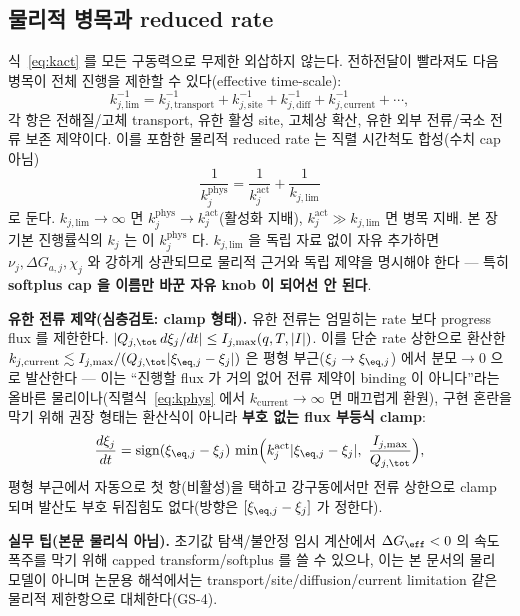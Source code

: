 \subsection{물리적 병목과 reduced rate}
식~\eqref{eq:kact} 를 모든 구동력으로 무제한 외삽하지 않는다. 전하전달이 빨라져도 다음 병목이 전체
진행을 제한할 수 있다(effective time-scale):
\begin{equation}
k_{j,\mathrm{lim}}^{-1}=k_{j,\mathrm{transport}}^{-1}+k_{j,\mathrm{site}}^{-1}+k_{j,\mathrm{diff}}^{-1}
+k_{j,\mathrm{current}}^{-1}+\cdots,
\label{eq:klim_comp}
\end{equation}
각 항은 전해질/고체 transport, 유한 활성 site, 고체상 확산, 유한 외부 전류/국소 전류 보존 제약이다.
이를 포함한 물리적 reduced rate 는 직렬 시간척도 합성(수치 cap 아님)
\begin{equation}
\boxed{\;\frac{1}{k_j^\mathrm{phys}}=\frac{1}{k_j^\mathrm{act}}+\frac{1}{k_{j,\mathrm{lim}}}\;}
\label{eq:kphys}
\end{equation}
로 둔다. $k_{j,\mathrm{lim}}\to\infty$ 면 $k_j^\mathrm{phys}\to k_j^\mathrm{act}$(활성화 지배),
$k_j^\mathrm{act}\gg k_{j,\mathrm{lim}}$ 면 병목 지배. 본 장 기본 진행률식의 $k_j$ 는 이
$k_j^\mathrm{phys}$ 다. $k_{j,\mathrm{lim}}$ 을 독립 자료 없이 자유 추가하면 $\nu_j,\Delta G_{a,j},\chi_j$
와 강하게 상관되므로 물리적 근거와 독립 제약을 명시해야 한다 — 특히 \textbf{softplus cap 을 이름만 바꾼
자유 knob 이 되어선 안 된다}.

\textbf{유한 전류 제약(심층검토: clamp 형태).} 유한 전류는 엄밀히는 rate 보다 progress flux 를 제한한다.
$|Q_{j,\tot}\,d\xi_j/dt|\le I_{j,\max}(q,T,|I|)$. 이를 단순 rate 상한으로 환산한
$k_{j,\mathrm{current}}\lesssim I_{j,\max}/(Q_{j,\tot}|\xi_{\eq,j}-\xi_j|)$ 은 평형 부근($\xi_j\to\xi_{\eq,j}$)
에서 분모$\to0$ 으로 발산한다 — 이는 ``진행할 flux 가 거의 없어 전류 제약이 binding 이 아니다''라는
올바른 물리이나(직렬식~\eqref{eq:kphys} 에서 $k_{\mathrm{current}}\to\infty$ 면 매끄럽게 환원), 구현
혼란을 막기 위해 권장 형태는 환산식이 아니라 \textbf{부호 없는 flux 부등식 clamp}:
\begin{equation}
\frac{d\xi_j}{dt}=\operatorname{sign}(\xi_{\eq,j}-\xi_j)\,
\min\!\Big(k_j^\mathrm{act}|\xi_{\eq,j}-\xi_j|,\ \frac{I_{j,\max}}{Q_{j,\tot}}\Big),
\label{eq:clamp}
\end{equation}
평형 부근에서 자동으로 첫 항(비활성)을 택하고 강구동에서만 전류 상한으로 clamp 되며 발산도 부호
뒤집힘도 없다(방향은 $[\xi_{\eq,j}-\xi_j]$ 가 정한다).
\begin{mdframed}
\textbf{실무 팁(본문 물리식 아님).} 초기값 탐색/불안정 임시 계산에서 $\Delta G_{\eff}<0$ 의 속도 폭주를
막기 위해 capped transform/softplus 를 쓸 수 있으나, 이는 본 문서의 물리 모델이 아니며 논문용 해석에서는
transport/site/diffusion/current limitation 같은 물리적 제한항으로 대체한다(GS-4).
\end{mdframed}

